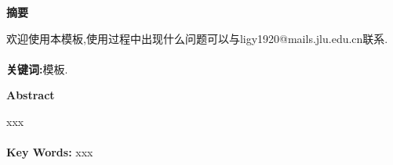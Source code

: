 \clearpage
\fancyhf{} %
\fancyfoot[C]{\thepage} %
\renewcommand{\headrulewidth}{0pt} %
\setlength{\parindent}{2em} %

\vspace*{24pt}
\centerline{\rmfamily\bfseries 摘\quad 要}
\vspace*{18pt}
\fontsize{12}{20}\selectfont  

欢迎使用本模板,使用过程中出现什么问题可以与ligy1920@mails.jlu.edu.cn联系.\\
\vspace{-25pt}\\
\textbf{关键词:}模板.

\vspace*{3cm}
\centerline{ \bfseries Abstract}
\vspace*{18pt}
\fontsize{11.5}{18}\selectfont 

xxx\\
\vspace{-22pt}\\
\textbf{ Key Words:} xxx
\clearpage
